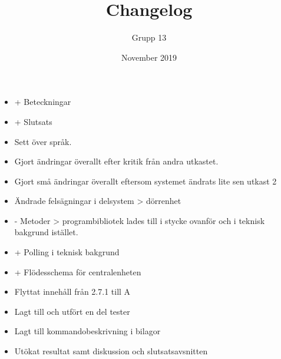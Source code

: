 \documentclass{article}
\title{Changelog}
\author{Grupp 13}
\date{November 2019}
\begin{document}
\maketitle
\begin{itemize}
    \item + Beteckningar
    \item + Slutsats
    \item Sett över språk.
    \item Gjort ändringar överallt efter kritik från andra utkastet. 
    \item Gjort små ändringar överallt eftersom systemet ändrats lite sen utkast 2
    \item Ändrade felsägningar i delsystem > dörrenhet
    \item - Metoder > programbibliotek lades till i stycke ovanför och i teknisk bakgrund istället.
    \item + Polling i teknisk bakgrund
    \item + Flödesschema för centralenheten
    \item Flyttat innehåll från 2.7.1 till A
    \item Lagt till och utfört en del tester
    \item Lagt till kommandobeskrivning i bilagor
    \item Utökat resultat samt diskussion och slutsatsavsnitten
\end{itemize}
\end{document}
